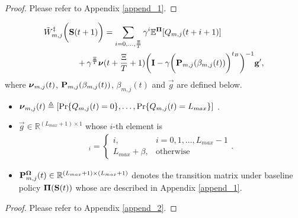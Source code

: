 \begin{proof}
    Please refer to Appendix \ref{append_1}.
\end{proof}

\begin{lemma}
    \label{lemma:w_es}
    {\small
    \begin{align}
        &\tilde{W}^{\ddagger}_{m,j}\bigg(\mathbf{S}(t+1)\bigg)
        = \sum_{i=0,\dots,\frac{\Xi}{T}} \gamma^{i} \mathbb{E}^{\boldsymbol{\Pi}}[ Q_{m,j}({t+i+1}) ]
        \nonumber\\
        &~~~~~~~~~~~~+ \gamma^{\frac{\Xi}{T}} 
        \boldsymbol{\nu}({t+\frac{\Xi}{T}+1})
        \bigg(
            \mathbf{I} - \gamma \bigg(\mathbf{P}_{m,j}(\beta_{m,j}(t))\bigg)^{t_B}
        \bigg)^{-1} \mathbf{g}',
        \label{w_es}
    \end{align}   
    }
    where $\boldsymbol{\nu}_{m,j}(t)$, $\mathbf{P}_{m,j}(\beta_{m,j}(t))$, $\beta_{m,j}(t)$ and $\vec{g}$ are defined below.
    \begin{itemize}
        \item {\small
        $\boldsymbol{\nu}_{m,j}(t) \triangleq [\Pr\{Q_{m,j}(t)=0\}, \dots, \Pr\{Q_{m,j}(t)=L_{max}\}]$
        }.

        \item $\vec{g} \in \mathbb{R}^{(L_{max}+1) \times 1}$ whose $i$-th element is
        \begin{align}
            [\vec{g}]_{i} = 
            \begin{cases}
                i, & i=0,1,\dots,L_{max}-1
                \\
                L_{max}+\beta, & \text{otherwise}
            \end{cases}.
            \label{eqn:g_vec}
        \end{align}

        \item $\mathbf{P}^{\boldsymbol{\Omega}}_{m,j}(t) \in \mathbb{R}^{(L_{max}+1) \times (L_{max}+1)}$ denotes the transition matrix under baseline policy $\boldsymbol{\Pi}(\mathbf{S}(t))$ whose are described in Appendix \ref{append_1}.
    \end{itemize}   
\end{lemma}
\begin{proof}
    Please refer to Appendix \ref{append_2}.
\end{proof}

